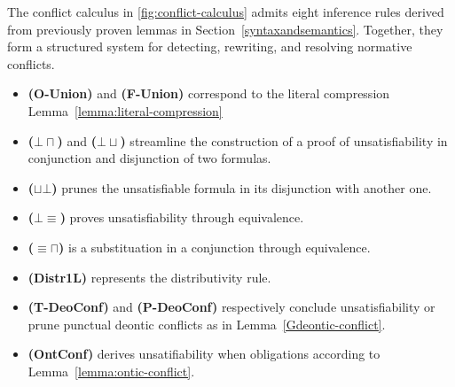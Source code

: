 The conflict calculus in \ref{fig:conflict-calculus} admits eight inference rules derived from  previously proven lemmas in Section~\ref{syntaxandsemantics}.  
Together, they form a structured system for detecting, rewriting, and resolving normative conflicts.

\begin{itemize}
\item \textbf{(O-Union)} and \textbf{(F-Union)} correspond to the literal compression Lemma~\ref{lemma:literal-compression}
\item \textbf{($\bm{\bot\sqcap}$)} and \textbf{($\bm{\bot\sqcup}$)} streamline the construction of a proof of unsatisfiability in conjunction and disjunction of two formulas.
\item \textbf{($\bm{\sqcup\bot}$)} prunes the unsatisfiable formula in its disjunction with another one.
\item \textbf{($\bm{\bot\equiv}$)}  proves unsatisfiability through equivalence.
\item \textbf{($\bm{\equiv\sqcap}$)} is a substituation in a conjunction through equivalence.
\item \textbf{(Distr1L)} represents the distributivity rule.
\item \textbf{(T-DeoConf)} and \textbf{(P-DeoConf)} respectively conclude unsatisfiability or prune punctual deontic conflicts as in Lemma~\ref{Gdeontic-conflict}.
\item \textbf{(OntConf)} derives unsatifiability when obligations according to Lemma~\ref{lemma:ontic-conflict}.
\end{itemize}

